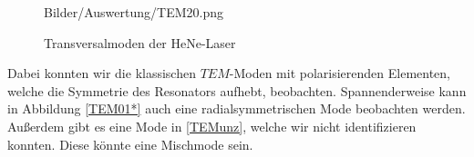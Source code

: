 \begin{figure}[ht]
{      {Bilder/Auswertung/TEM20.png}}\quad
      \quad
      \caption{Transversalmoden der HeNe-Laser}
      \label{bild:Moden}
  \end{figure}

  Dabei konnten wir die klassischen $TEM$-Moden mit polarisierenden Elementen, welche die Symmetrie des Resonators aufhebt, beobachten.
  Spannenderweise kann in Abbildung \ref{TEM01*} auch eine radialsymmetrischen Mode beobachten werden. Außerdem
  gibt es eine Mode in \ref{TEMunz}, welche wir nicht identifizieren konnten. Diese könnte eine Mischmode sein.
\clearpage
